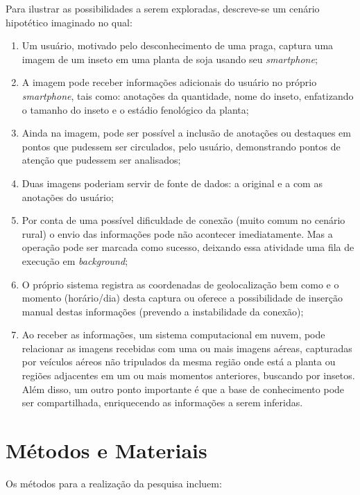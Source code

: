 \documentclass[12pt]{article}
\begin{document}
Para ilustrar as possibilidades a serem exploradas, descreve-se um cenário hipotético imaginado no qual:

\begin{enumerate}
	\item Um usuário, motivado pelo desconhecimento de uma praga, captura uma imagem de um inseto em uma planta de soja usando seu \textit{smartphone};
	\item A imagem pode receber informações adicionais do usuário no próprio \textit{smartphone}, tais como: anotações da quantidade, nome do inseto, enfatizando o tamanho do inseto e o estádio fenológico da planta;
	\item Ainda na imagem, pode ser possível a inclusão de anotações ou destaques em pontos que pudessem ser circulados, pelo usuário, demonstrando pontos de atenção que pudessem ser analisados;
	\item Duas imagens poderiam servir de fonte de dados: a original e a com as anotações do usuário;
	\item Por conta de uma possível dificuldade de conexão (muito comum no cenário rural) o envio das informações pode não acontecer imediatamente. Mas a operação pode ser marcada como sucesso, deixando essa atividade uma fila de execução em \textit{background};
	\item O próprio sistema registra as coordenadas de geolocalização bem como e o momento (horário/dia) desta captura ou oferece a possibilidade de inserção manual destas informações (prevendo a instabilidade da conexão);
	\item Ao receber as informações, um sistema computacional em nuvem, pode relacionar as imagens recebidas com uma ou mais imagens aéreas, capturadas por veículos aéreos não tripulados da mesma região onde está a planta ou regiões adjacentes em um ou mais momentos anteriores, buscando por insetos. Além disso, um outro ponto importante é que a base de conhecimento pode ser compartilhada, enriquecendo as informações a serem inferidas.
\end{enumerate}

\section{Métodos e Materiais}
\label{sec:metodos_materiais}
		
Os métodos para a realização da pesquisa incluem:
\end{document}
